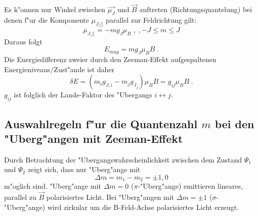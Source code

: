     Es k"onnen nur Winkel zwischen $\vec{\mu_J}$ und $\vec{B}$ auftreten (Richtungsquantelung) bei denen f"ur die Komponente $\mu_{{J_z}||}$ parallel zur Feldrichtung gilt:
    \begin{equation}
      \mu_{{J_z}||} = -mg_J\mu_B\;,\;, -J \leq m \leq J
    \end{equation}
    Daraus folgt
    \begin{equation}
      E_{mag} = mg_J\mu_BB \; .
    \end{equation}
    Die Energiedifferenz zweier durch den Zeeman-Effekt aufgespaltenen Energieniveaus/Zust"ande ist daher
    \begin{equation}
    \delta E = (m_ig_{J,i}-m_jg_{J_j})\mu_BB = g_{ij} \mu_BB \; .
    \label{g_ij} 
    \end{equation}
    $g_{ij}$ ist folglich der Lande-Faktor des "Ubergangs $i \leftrightarrow j$.


\iffalse
  \subsection{Der Zeeman-Effekt}
    Hat ein Atom ein magnetisches momen mue, wird erhaelt dieses zus"atzliche energie Emag=-mujB im aeusseren magnetfeld.
    res koennen nur winkel zwischen mue und b auftreten koennen. bei denen mujz =  ist (Richtungsquantelung), m ist debei element -j bis j.
    Damit wird e mag zu :

    F"ur S=0 ist gj immer 1 (normaler zeeman effekt), fuer s =/= ist gj = ... - gji (annormaler zeeman effekt)
\fi



  \subsection{Auswahlregeln f"ur die Quantenzahl $m$ bei den "Uberg"angen mit Zeeman-Effekt}
    Durch Betrachtung der "Ubergangswahrscheinlichkeit zwischen dem Zustand $\Psi_1$ und $\Psi_2$ zeigt sich, dass nur "Uberg"ange mit
    \begin{equation}
      \Delta m = m_1 - m_2= \pm1,0
    \end{equation}
     m"oglich sind.
    "Uberg"ange mit $\Delta m = 0$ ($\pi$-"Uberg"ange) emittieren lineares, parallel zu $\vec{B}$ polarisiertes Licht.
    Bei "Uberg"angen mit $\Delta m = \pm 1$ ($\sigma$-"Uberg"ange) wird zirkular um die B-Feld-Achse polarisiertes Licht erzeugt.

